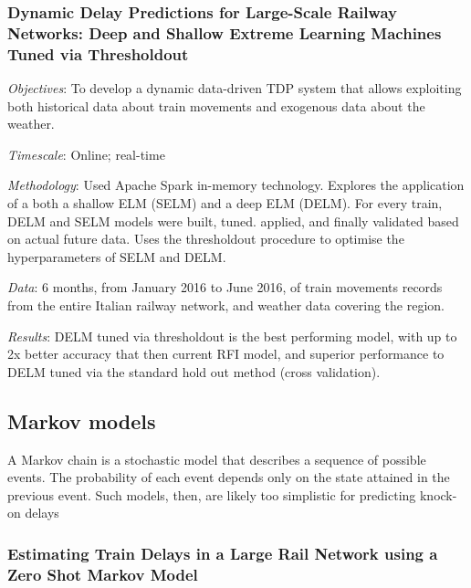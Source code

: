 \documentclass{article}
\begin{document}
\subsubsection{Dynamic Delay Predictions for Large-Scale Railway Networks: Deep and Shallow Extreme Learning Machines Tuned via Thresholdout \cite{oneto_et_al_2017b}}

\textit{Objectives}: To develop a dynamic data-driven TDP system that allows exploiting both historical data about train movements and exogenous data about the weather. 

\smallskip

\textit{Timescale}: Online; real-time

\smallskip

\textit{Methodology}: Used Apache Spark in-memory technology. Explores the application of a both a shallow ELM (SELM) and a deep ELM (DELM). For every train, DELM and SELM models were built, tuned. applied, and finally validated based on actual future data. Uses the thresholdout procedure to optimise the hyperparameters of SELM and DELM.

\smallskip

\textit{Data}: 6 months, from January 2016 to June 2016, of train movements records from the entire Italian railway network, and weather data covering the region. 

\smallskip

\textit{Results}: DELM tuned via thresholdout is the best performing model, with up to 2x better accuracy that then current RFI model, and superior performance to DELM tuned via the standard hold out method (cross validation). 


\subsection{Markov models}

A Markov chain is a stochastic model that describes a sequence of possible events. The probability of each event depends only on the state attained in the previous event.
Such models, then, are likely too simplistic for predicting knock-on delays

\subsubsection{Estimating Train Delays in a Large Rail Network using a Zero Shot Markov Model \cite{gaurav_et_al_2018}}
\end{document}
